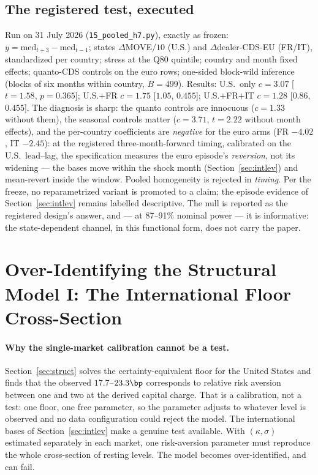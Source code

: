 \documentclass[11pt]{article}
\begin{document}
\subsection*{The registered test, executed}\label{sec:pooledexec}
Run on 31 July 2026 (\texttt{15\_pooled\_h7.py}), exactly as frozen: $y=\mathrm{med}_{t+3}-\mathrm{med}_{t-1}$; states $\Delta$MOVE$/10$ (U.S.) and $\Delta$dealer-CDS-EU (FR/IT), standardized per country; stress at the Q80 quintile; country and month fixed effects; quanto-CDS controls on the euro rows; one-sided block-wild inference (blocks of six months within country, $B=499$). Results: U.S.\ only $c=3.07$ [$t=1.58$, $p=0.365$]; U.S.$+$FR $c=1.75$ [$1.05$, $0.455$]; U.S.$+$FR$+$IT $c=1.28$ [$0.86$, $0.455$]. The diagnosis is sharp: the quanto controls are innocuous ($c=1.33$ without them), the seasonal controls matter ($c=3.71$, $t=2.22$ without month effects), and the per-country coefficients are \emph{negative} for the euro arms (FR $-4.02$, IT $-2.45$): at the registered three-month-forward timing, calibrated on the U.S.\ lead--lag, the specification measures the euro episode's \emph{reversion}, not its widening --- the bases move within the shock month (Section~\ref{sec:intlev}) and mean-revert inside the window. Pooled homogeneity is rejected in \emph{timing}. Per the freeze, no reparametrized variant is promoted to a claim; the episode evidence of Section~\ref{sec:intlev} remains labelled descriptive. The null is reported as the registered design's answer, and --- at 87--91\% nominal power --- it is informative: the state-dependent channel, in this functional form, does not carry the paper.


\section{Over-Identifying the Structural Model I: The International Floor Cross-Section}\label{sec:floorxs}

\paragraph{Why the single-market calibration cannot be a test.} Section~\ref{sec:struct} solves the
certainty-equivalent floor for the United States and finds that the observed $17.7$--$23.3\bp$
corresponds to relative risk aversion between one and two at the derived capital charge. That is a
calibration, not a test: one floor, one free parameter, so the parameter adjusts to whatever level
is observed and no data configuration could reject the model. The international bases of
Section~\ref{sec:intlev} make a genuine test available. With $(\kappa,\sigma)$ estimated separately
in each market, one risk-aversion parameter must reproduce the whole cross-section of resting
levels. The model becomes over-identified, and can fail.
\end{document}

